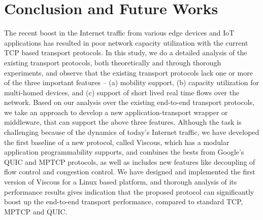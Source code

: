 \section{Conclusion and Future Works}
%

The recent boost in the Internet traffic from various edge devices and IoT applications has resulted in poor network capacity utilization with the current TCP based transport protocols. In this study, we do a detailed analysis of the existing transport protocols, both theoretically and through thorough experiments, and observe that the existing transport protocols lack one or more of the three important features -- (a) mobility support, (b) capacity utilization for multi-homed devices, and (c) support of short lived real time flows over the network. Based on our analysis over the existing end-to-end transport protocols, we take an approach to develop a new application-transport wrapper or middleware, that can support the above three features. Although the task is challenging because of the dynamics of today's Internet traffic, we have developed the first baseline of a new protocol, called Viscous, which has a modular application programmability supports, and combines the bests from Google's QUIC and MPTCP protocols, as well as includes new features like decoupling of flow control and congestion control. We have designed and implemented the first version of Viscous for a Linux based platform, and thorough analysis of its performance results gives indication that the proposed protocol can significantly boost up the end-to-end transport performance, compared to standard TCP, MPTCP and QUIC. 

